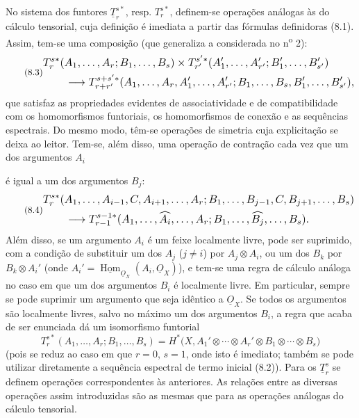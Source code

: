 \documentclass[11pt,twoside,openany]{book}
\numberwithin{equation}{section}
\newcommand{\src}[1]{%
  \phantomsection\hypertarget{src:#1}{}%
  \marginpar{\raggedleft\footnotesize\sffamily #1}%
}
\newcommand{\Osh}{\underline{O}}
\newcommand{\Homsh}{\underline{\operatorname{Hom}}}
\theoremstyle{plain}
\theoremstyle{definition}
\theoremstyle{remark}
\newcommand{\FgaUnitKey}{frontmatter}
\renewcommand{\src}[1]{%
  \phantomsection\hypertarget{src:\FgaUnitKey:#1}{}%
  \marginpar{\raggedleft\footnotesize\sffamily #1}%
}
\begin{document}
No sistema dos funtores $\underline{T}_{r}^{s*}$, resp.
$T_{r}^{s*}$, definem-se operações análogas às do cálculo tensorial, cuja
definição é imediata a partir das fórmulas definidoras (8.1). Assim, tem-se
uma composição (que generaliza a considerada no n\textsuperscript{o} 2):
\begin{equation}\tag{8.3}
\resizebox{\textwidth}{!}{$
\begin{aligned}
&T_{r}^{s*}(A_1,\ldots,A_r;B_1,\ldots,B_s)
\times T_{r'}^{s'*}(A'_1,\ldots,A'_{r'};B'_1,\ldots,B'_{s'})\\
&\qquad\longrightarrow
T_{r+r'}^{s+s'*}
(A_1,\ldots,A_r,A'_1,\ldots,A'_{r'};
 B_1,\ldots,B_s,B'_1,\ldots,B'_{s'}),
\end{aligned}
$}
\end{equation}
que satisfaz as propriedades evidentes de associatividade e de compatibilidade com
os homomorfismos funtoriais, os homomorfismos de conexão e as sequências
espectrais. Do mesmo modo, têm-se operações de simetria cuja explicitação se deixa ao
leitor. Tem-se, além disso, uma operação de contração cada vez que
um dos argumentos $A_i$

\src{191}
é igual a um dos argumentos $B_j$:
\begin{equation}\tag{8.4}
\resizebox{\textwidth}{!}{$
\begin{aligned}
&T_{r}^{s*}(A_1,\ldots,A_{i-1},C,A_{i+1},\ldots,A_r;
 B_1,\ldots,B_{j-1},C,B_{j+1},\ldots,B_s)\\
&\qquad\longrightarrow
T_{r-1}^{s-1*}(A_1,\ldots,\widehat{A_i},\ldots,A_r;
 B_1,\ldots,\widehat{B_j},\ldots,B_s).
\end{aligned}
$}
\end{equation}
Além disso, se um argumento $A_i$ é um feixe localmente livre, pode
ser suprimido, com a condição de substituir um dos $A_j$ ($j\neq i$) por
$A_j\otimes A_i$, ou um dos $B_k$ por $B_k\otimes A_i'$ (onde
$A_i'=\Homsh_{\Osh_X}(A_i,\Osh_X)$), e tem-se uma regra de cálculo análoga no
caso em que um dos argumentos $B_i$ é localmente livre. Em particular, sempre
se pode suprimir um argumento que seja idêntico a $\Osh_X$. Se todos os
argumentos são localmente livres, salvo no máximo um dos argumentos $B_i$, a regra
que acaba de ser enunciada dá um isomorfismo funtorial
\begin{equation}\tag{8.5}
  T_{r}^{s*}(A_1,\ldots,A_r;B_1,\ldots,B_s)
  =H^{*}\bigl(X,A_1'\otimes\cdots\otimes A_r'
    \otimes B_1\otimes\cdots\otimes B_s\bigr)
\end{equation}
(pois se reduz ao caso em que $r=0$, $s=1$, onde isto é imediato; também se
pode utilizar diretamente a sequência espectral de termo inicial (8.2)). Para os
$\underline{T}_{r}^{s}$ se definem operações correspondentes às anteriores.
As relações entre as diversas operações assim
introduzidas são as mesmas que para as operações análogas do cálculo
tensorial.
\end{document}
